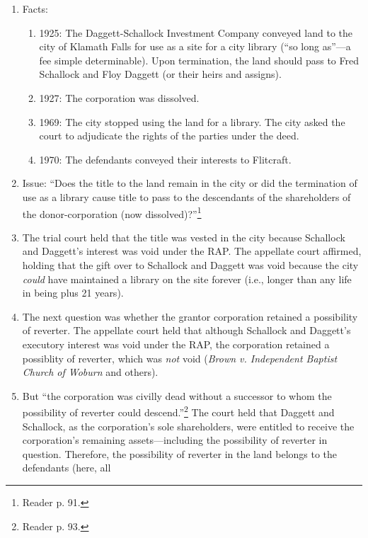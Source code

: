 \begin{enumerate}
    \item Facts:
    \begin{enumerate}
        \item 1925: The Daggett-Schallock Investment Company conveyed land to 
        the city of Klamath Falls for use as a site for a city library (``so 
        long as''---a fee simple determinable). Upon termination, the land 
        should pass to Fred Schallock and Floy Daggett (or their heirs and 
        assigns).
        \item 1927: The corporation was dissolved.
        \item 1969: The city stopped using the land for a library. The city 
        asked the court to adjudicate the rights of the parties under the 
        deed.
        \item 1970: The defendants conveyed their interests to Flitcraft.
    \end{enumerate}
    \item Issue: ``Does the title to the land remain in the city or did the 
    termination of use as a library cause title to pass to the descendants of 
    the shareholders of the donor-corporation (now 
    dissolved)?''\footnote{Reader p. 91.}
    \item The trial court held that the title was vested in the city because 
    Schallock and Daggett's interest was void under the RAP. The appellate 
    court affirmed, holding that the gift over to Schallock and Daggett was 
    void because the city \emph{could} have maintained a library on the site 
    forever (i.e., longer than any life in being plus 21 years).
    \item The next question was whether the grantor corporation retained a 
    possibility of reverter. The appellate court held that although Schallock 
    and Daggett's executory interest was void under the RAP, the corporation 
    retained a possiblity of reverter, which was \emph{not} void (\emph{Brown 
    v. Independent Baptist Church of Woburn} and others).
    \item But ``the corporation was civilly dead without a successor to whom 
    the possibility of reverter could descend.''\footnote{Reader p. 93.} The 
    court held that Daggett and Schallock, as the corporation's sole 
    shareholders, were entitled to receive the corporation's remaining 
    assets---including the possibility of reverter in question. Therefore, the 
    possibility of reverter in the land belongs to the defendants (here, all 

\end{enumerate}
